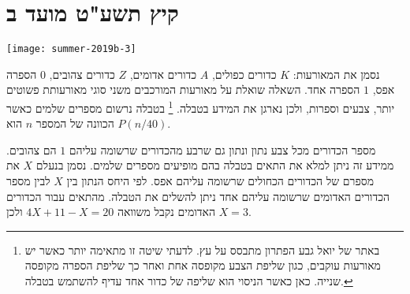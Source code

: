 

\section{קיץ תשע"ט מועד ב}

\begin{center}
\texttt{[image: summer-2019b-3]}
\end{center}

נסמן את המאורעות:
$K$
כדורים כפולים, 
$A$
כדורים אדומים,
$Z$
כדורים צהובים,
$0$
הספרה אפס,
$1$
הספרה אחד. השאלה שואלת על מאורעות המורכבים משני סוגי מאורעותת פשוטים יותר, צבעים וספרות, ולכן נארגן את המידע בטבלה.%
\footnote{%
באתר של יואל גבע הפתרון מתבסס על עץ. לדעתי שיטה זו מתאימה יותר כאשר יש מאורעות עוקבים, כגון שליפת הצבע מקופסה אחת ואחר כך שליפת הספרה מקופסה שנייה. כאן כאשר הניסוי הוא שליפה של כדור אחד עדיף להשתמש בטבלה.} בטבלה נרשום מספרים שלמים כאשר הכוונה של המספר 
$n$
הוא 
$P(n/40)$.

מספר הכדורים מכל צבע נתון ונתון גם שרבע מהכדורים שרשומה עליהם 
$1$
הם צהובים. ממידע זה ניתן למלא את התאים בטבלה בהם מופיעים מספרים שלמים. נסמן בנעלם
$X$
את מספרם של הכדורים הכחולים שרשומה עליהם אפס. לפי היחס הנתון בין 
$X$
לבין מספר הכדורים האדומים שרשומה עליהם אחד ניתן להשלים את הטבלה. מהתאים עבור הכדורים האדומים נקבל משוואה
$4X+11-X=20$
ולכן 
$X=3$.

\begin{center}
\end{center}

\newpage

